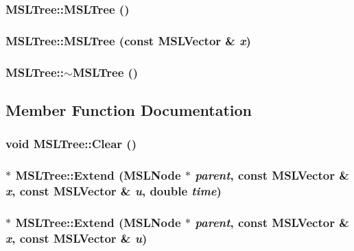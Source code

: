 \subsubsection{\setlength{\rightskip}{0pt plus 5cm}MSLTree::MSLTree ()}\label{class_MSLTree_a0}


\subsubsection{\setlength{\rightskip}{0pt plus 5cm}MSLTree::MSLTree (const {\bf MSLVector} \& {\em x})}\label{class_MSLTree_a1}


\subsubsection{\setlength{\rightskip}{0pt plus 5cm}MSLTree::$\sim$MSLTree ()}\label{class_MSLTree_a2}




\subsection{Member Function Documentation}
\subsubsection{\setlength{\rightskip}{0pt plus 5cm}void MSLTree::Clear ()}\label{class_MSLTree_a11}


\subsubsection{$\ast$ MSLTree::Extend ({\bf MSLNode} $\ast$ {\em parent}, const {\bf MSLVector} \& {\em x}, const {\bf MSLVector} \& {\em u}, double {\em time})}\label{class_MSLTree_a5}


\subsubsection{$\ast$ MSLTree::Extend ({\bf MSLNode} $\ast$ {\em parent}, const {\bf MSLVector} \& {\em x}, const {\bf MSLVector} \& {\em u})}\label{class_MSLTree_a4}


